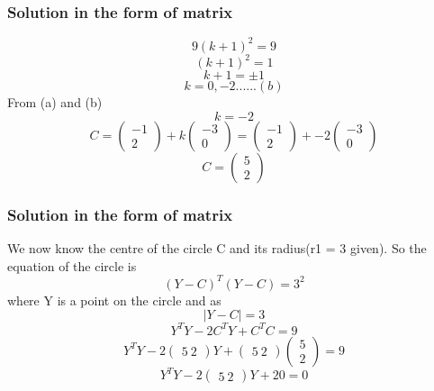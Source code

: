 \documentclass{beamer}
\begin{document}
\begin{frame}
\frametitle{Solution in the form of matrix}
$$ 9(k+1)^2 = 9 $$
$$ (k+1)^2 = 1 $$
$$ k + 1 = \pm 1 $$
$$ k = 0,-2  ......(b)$$ 
From (a) and (b) $$ k = -2 $$
$$ C = \begin{pmatrix}-1\\ 2 \end{pmatrix} + k\begin{pmatrix}-3\\ 0 \end{pmatrix} = \begin{pmatrix}-1\\ 2 \end{pmatrix} + -2\begin{pmatrix}-3\\ 0 \end{pmatrix} $$ 
$$C = \begin{pmatrix}5\\ 2 \end{pmatrix}$$
\end{frame}

\begin{frame}
\frametitle{Solution in the form of matrix}
We now know the centre of the circle C and its radius(r1 = 3 given). So the equation of the circle is 
$$(Y - C)^T(Y - C) = 3^2 $$
where Y is a point on the circle and as $$|Y - C| = 3$$
$$Y^TY - 2C^TY + C^TC = 9 $$
$$Y^TY - 2\begin{pmatrix}5\ 2 \end{pmatrix}Y + \begin{pmatrix}5\ 2 \end{pmatrix}\begin{pmatrix}5\\ 2 \end{pmatrix} = 9 $$
\begin{equation}
Y^TY - 2\begin{pmatrix}5\ 2 \end{pmatrix}Y + 20 = 0 
\end{equation}
\end{frame}
\end{document}
